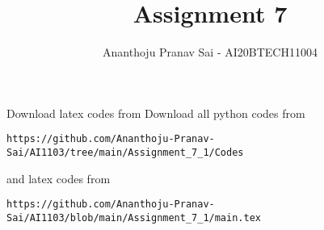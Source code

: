\documentclass[journal,12pt,twocolumn]{IEEEtran}
\DeclareMathOperator*{\Res}{Res}
\begin{document}
\newcommand{\BEQA}{\begin{eqnarray}}
\newcommand{\EEQA}{\end{eqnarray}}
\newcommand{\define}{\stackrel{\triangle}{=}}

\raggedbottom
\setlength{\parindent}{0pt}
\providecommand{\mbf}{\mathbf}
\providecommand{\pr}[1]{\ensuremath{\Pr\left(#1\right)}}
\providecommand{\qfunc}[1]{\ensuremath{Q\left(#1\right)}}
\providecommand{\sbrak}[1]{\ensuremath{{}\left[#1\right]}}
\providecommand{\lsbrak}[1]{\ensuremath{{}\left[#1\right.}}
\providecommand{\rsbrak}[1]{\ensuremath{{}\left.#1\right]}}
\providecommand{\brak}[1]{\ensuremath{\left(#1\right)}}
\providecommand{\lbrak}[1]{\ensuremath{\left(#1\right.}}
\providecommand{\rbrak}[1]{\ensuremath{\left.#1\right)}}
\providecommand{\cbrak}[1]{\ensuremath{\left\{#1\right\}}}
\providecommand{\lcbrak}[1]{\ensuremath{\left\{#1\right.}}
\providecommand{\rcbrak}[1]{\ensuremath{\left.#1\right\}}}
\theoremstyle{remark}
\newtheorem{rem}{Remark}
\newcommand{\sgn}{\mathop{\mathrm{sgn}}}
\providecommand{\abs}[1]{\vert#1\vert}
\providecommand{\res}[1]{\Res\displaylimits_{#1}} 
\providecommand{\norm}[1]{\lVert#1\rVert}
\providecommand{\mtx}[1]{\mathbf{#1}}
\providecommand{\mean}[1]{E[ #1 ]}
\providecommand{\fourier}{\overset{\mathcal{F}}{ \rightleftharpoons}}
\providecommand{\system}{\overset{\mathcal{H}}{ \longleftrightarrow}}
\newcommand{\solution}{\noindent \textbf{Solution: }}
\newcommand{\cosec}{\,\text{cosec}\,}
\providecommand{\dec}[2]{\ensuremath{\overset{#1}{\underset{#2}{\gtrless}}}}
\newcommand{\myvec}[1]{\ensuremath{\begin{pmatrix}#1\end{pmatrix}}}
\newcommand{\mydet}[1]{\ensuremath{\begin{vmatrix}#1\end{vmatrix}}}
\makeatletter
{}
\makeatother
\let\StandardTheFigure\thefigure
\let\vec\mathbf
\renewcommand{\thefigure}{\theproblem}
\def\putbox#1#2#3{\makebox[0in][l]{\makebox[#1][l]{}\raisebox{\baselineskip}[0in][0in]{\raisebox{#2}[0in][0in]{#3}}}}
     \def\rightbox#1{\makebox[0in][r]{#1}}
     \def\centbox#1{\makebox[0in]{#1}}
     \def\topbox#1{\raisebox{-\baselineskip}[0in][0in]{#1}}
     \def\midbox#1{\raisebox{-0.5\baselineskip}[0in][0in]{#1}}
\vspace{3cm}
\title{Assignment 7}
\author{Ananthoju Pranav Sai - AI20BTECH11004}
\maketitle
\newpage
\bigskip
\renewcommand{\thefigure}{\theenumi}
\renewcommand{\thetable}{\theenumi}
Download latex codes from 
%
Download all python codes from 
\begin{lstlisting}
https://github.com/Ananthoju-Pranav-Sai/AI1103/tree/main/Assignment_7_1/Codes
\end{lstlisting}
%
and latex codes from 
%
\begin{lstlisting}
https://github.com/Ananthoju-Pranav-Sai/AI1103/blob/main/Assignment_7_1/main.tex
\end{lstlisting}
\end{document}
